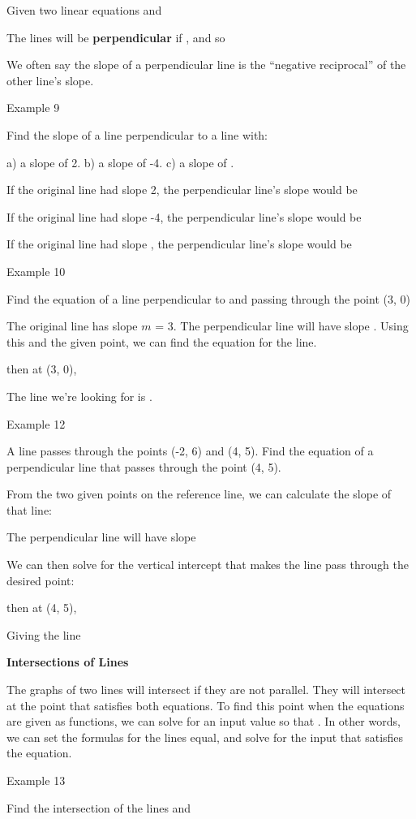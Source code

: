 Given two linear equations and

The lines will be \textbf{perpendicular} if , and so

We often say the slope of a perpendicular line is the ``negative
reciprocal'' of the other line's slope.

Example 9

Find the slope of a line perpendicular to a line with:

a) a slope of 2. b) a slope of -4. c) a slope of .

If the original line had slope 2, the perpendicular line's slope would
be

If the original line had slope -4, the perpendicular line's slope would
be

If the original line had slope , the perpendicular line's slope would be

Example 10

Find the equation of a line perpendicular to and passing through the
point (3, 0)

The original line has slope $m$ = 3. The perpendicular line will
have slope . Using this and the given point, we can find the equation
for the line.

then at (3, 0),

The line we're looking for is .


Example 12

A line passes through the points (-2, 6) and (4, 5). Find the equation
of a perpendicular line that passes through the point (4, 5).

From the two given points on the reference line, we can calculate the
slope of that line:

The perpendicular line will have slope

We can then solve for the vertical intercept that makes the line pass
through the desired point:

then at (4, 5),

Giving the line

\textbf{Intersections of Lines}

The graphs of two lines will intersect if they are not parallel. They
will intersect at the point that satisfies both equations. To find this
point when the equations are given as functions, we can solve for an
input value so that . In other words, we can set the formulas for the
lines equal, and solve for the input that satisfies the equation.

Example 13

Find the intersection of the lines and

